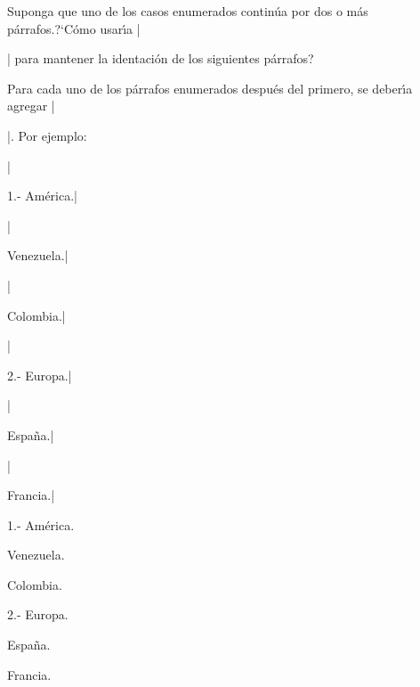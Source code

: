 


\bigskip

\enunciadoS Suponga que uno de los casos enumerados contin\'ua por dos
o m\'as p\'arrafos.?`C\'omo usar\'{\i}a |\item| para mantener la
identaci\'on de los siguientes p\'arrafos?

\bigskip

\respuestaS Para cada uno de los p\'arrafos enumerados despu\'es del
primero, se deber\'{\i}a agregar |\item{}|. Por ejemplo:

|\item{1.- } Am\'erica.|

|\item{} Venezuela.|

|\item{} Colombia.|

|\item{2.- } Europa.|

|\item{} Espa\~na.|

|\item{} Francia.|


\item{1.- } Am\'erica.
\item{} Venezuela.
\item{} Colombia.


\item{2.- } Europa.
\item{} Espa\~na.
\item{} Francia.

\bye